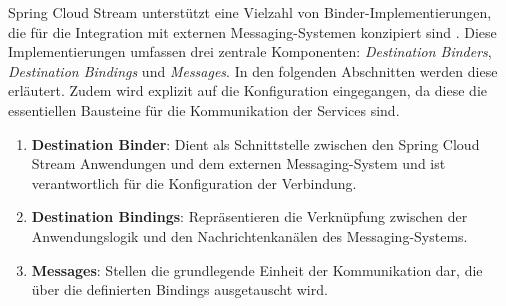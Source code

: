 

Spring Cloud Stream unterstützt eine Vielzahl von Binder-Implementierungen, die für die Integration mit externen Messaging-Systemen konzipiert sind \parencite[vgl.][]{springcloudstream}. Diese Implementierungen umfassen drei zentrale Komponenten: \textit{Destination Binders}, \textit{Destination Bindings} und \textit{Messages}. In den folgenden Abschnitten werden diese erläutert. Zudem wird explizit auf die Konfiguration eingegangen, da diese die essentiellen Bausteine für die Kommunikation der Services sind.
\begin{enumerate}
  \item \textbf{Destination Binder}: Dient als Schnittstelle zwischen den Spring Cloud Stream Anwendungen und dem externen Messaging-System und ist verantwortlich für die Konfiguration der Verbindung.
  \item \textbf{Destination Bindings}: Repräsentieren die Verknüpfung zwischen der Anwendungslogik und den Nachrichtenkanälen des Messaging-Systems.
  \item \textbf{Messages}: Stellen die grundlegende Einheit der Kommunikation dar, die über die definierten Bindings ausgetauscht wird.
\end{enumerate}

